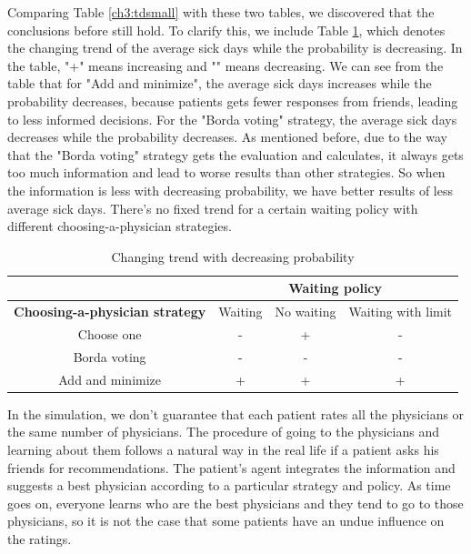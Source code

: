 Comparing Table \ref{ch3:tdsmall} with these two tables, we discovered that the conclusions before still hold. To clarify this, we include Table \ref{ch3:ttrend}, which denotes the changing trend of the average sick days while the probability is decreasing. In the table, "+" means increasing and "" means decreasing. We can see from the table that for "Add and minimize", the average sick days increases while the probability decreases, because patients gets fewer responses from friends, leading to less informed decisions. For the "Borda voting" strategy, the average sick days decreases while the probability decreases. As mentioned before, due to the way that the "Borda voting" strategy gets the evaluation and calculates, it always gets too much information and lead to worse results than other strategies. So when the information is less with decreasing probability, we have better results of less average sick days. There's no fixed trend for a certain waiting policy with different choosing-a-physician strategies.

\begin{table}[!t]
\centering
\caption{Changing trend with decreasing probability}

\begin{tabular}{|c|c|c|c|}
\hline
& \multicolumn{3}{c|}{\textbf{Waiting policy}}\\ \hline
\textbf{Choosing-a-physician strategy}
& Waiting & No waiting & Waiting with limit\\ \hline
Choose one &- &+ &-\\ \hline
Borda voting &- &- &-\\ \hline
Add and minimize &+ &+ &+\\ \hline
\end{tabular}
\label{ch3:ttrend}
\end{table}

In the simulation, we don't guarantee that each patient rates all the physicians or the same number of physicians. The procedure of going to the physicians and learning about them follows a natural way in the real life if a patient asks his friends for recommendations. The patient's agent integrates the information and suggests a best physician according to a particular strategy and policy. As time goes on, everyone learns who are the best physicians and they tend to go to those physicians, so it is not the case that some patients have an undue influence on the ratings. 

